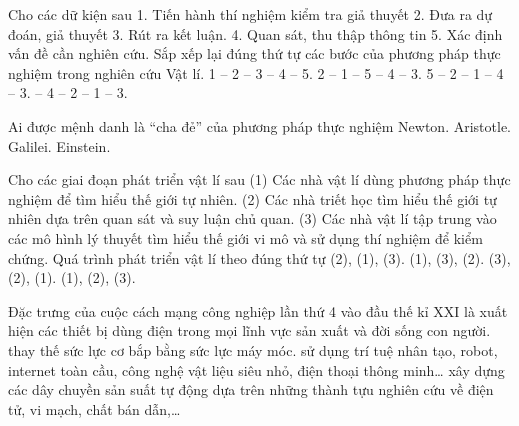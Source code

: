 \begin{ex}
Cho các dữ kiện sau 
1. Tiến hành thí nghiệm kiểm tra giả thuyết	2. Đưa ra dự đoán, giả thuyết 
3. Rút ra kết luận. 		4. Quan sát, thu thập thông tin 
5. Xác định vấn đề cần nghiên cứu.
Sắp xếp lại đúng thứ tự các bước của phương pháp thực nghiệm trong nghiên cứu Vật lí.
\choice
{1 – 2 – 3 – 4 – 5.}
{2 – 1 – 5 – 4 – 3.}
{5 – 2 – 1 – 4 – 3.}
{ – 4 – 2 – 1 – 3.}
\end{ex}

\begin{ex}
Ai được mệnh danh là “cha đẻ” của phương pháp thực nghiệm 
\choice
{Newton.}
{Aristotle.}
{\True Galilei.}
{Einstein.}
\end{ex}

\begin{ex}
Cho các giai đoạn phát triển vật lí sau
(1) Các nhà vật lí dùng phương pháp thực nghiệm để tìm hiểu thế giới tự nhiên.
(2) Các nhà triết học tìm hiểu thế giới tự nhiên dựa trên quan sát và suy luận chủ quan.
(3) Các nhà vật lí tập trung vào các mô hình lý thuyết tìm hiểu thế giới vi mô và sử dụng thí nghiệm để kiểm chứng.
Quá trình phát triển vật lí theo đúng thứ tự
\choice
{\True (2), (1), (3).}
{(1), (3), (2).}
{(3), (2), (1).}
{(1), (2), (3).}
\end{ex}

\begin{ex}
Đặc trưng của cuộc cách mạng công nghiệp lần thứ 4 vào đầu thế kỉ XXI là
\choice
{xuất hiện các thiết bị dùng điện trong mọi lĩnh vực sản xuất và đời sống con người.}
{thay thế sức lực cơ bắp bằng sức lực máy móc.}
{\True sử dụng trí tuệ nhân tạo, robot, internet toàn cầu, công nghệ vật liệu siêu nhỏ, điện thoại thông minh…}
{xây dựng các dây chuyền sản suất tự động dựa trên những thành tựu nghiên cứu về điện tử, vi mạch, chất bán dẫn,…}
\end{ex}

